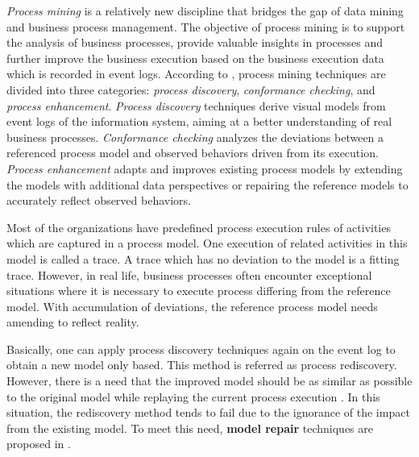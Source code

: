 %
\emph{Process mining} is a relatively new discipline that bridges the gap of data mining and business process management. The objective of process mining is to support the analysis of business processes, provide valuable insights in processes and further improve the business execution based on the business execution data which is recorded in event logs. According to  \cite{van2011process}, process mining techniques are divided into three categories: \emph{process discovery}, \emph{conformance checking}, and \emph{process enhancement}. \emph{Process discovery} techniques derive visual models from event logs of the information system, aiming at a better understanding of real business processes. \emph{Conformance checking} analyzes the deviations between a referenced process model and observed behaviors driven from its execution. \emph{Process enhancement} adapts and improves existing process models by extending the models with additional data perspectives or repairing the reference models to accurately reflect observed behaviors. 

Most of the organizations have predefined process execution rules of activities which are captured in a process model. One execution of related activities in this model is called a trace. A trace which has no deviation to the model is a fitting trace. However, in real life, business processes often encounter exceptional situations where it is necessary to execute process differing from the reference model. With accumulation of deviations, the reference process model needs amending to reflect reality. 


Basically, one can apply process discovery techniques again  on the event log to obtain a new model only based. This method is referred as process rediscovery. However, there is a need that the improved model should be as similar as possible to the original model while replaying the current process execution \cite{fahland2012repairing}. In this situation, the rediscovery method tends to fail due to the ignorance of the impact from the existing model. To meet this need, \textbf{model repair} techniques are proposed in  \cite{fahland2012repairing}.

